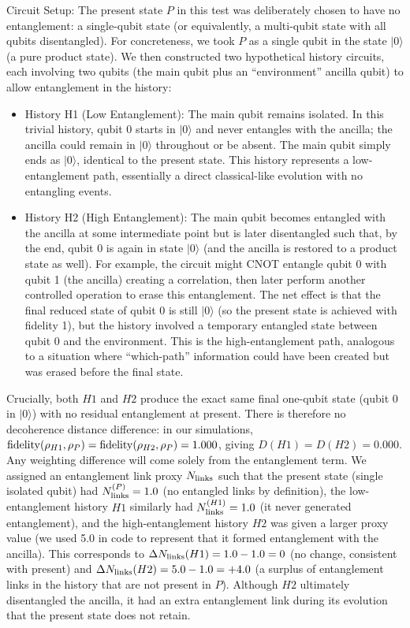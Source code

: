 \documentclass[11pt]{article}
\begin{document}
Circuit Setup: The present state $P$ in this test was deliberately chosen to have no entanglement: a single-qubit state (or equivalently, a multi-qubit state with all qubits disentangled). For concreteness, we took $P$ as a single qubit in the state $|0\rangle$ (a pure product state). We then constructed two hypothetical history circuits, each involving two qubits (the main qubit plus an “environment” ancilla qubit) to allow entanglement in the history:
\begin{itemize}
    \item History H1 (Low Entanglement): The main qubit remains isolated. In this trivial history, qubit 0 starts in $|0\rangle$ and never entangles with the ancilla; the ancilla could remain in $|0\rangle$ throughout or be absent. The main qubit simply ends as $|0\rangle$, identical to the present state. This history represents a low-entanglement path, essentially a direct classical-like evolution with no entangling events.
    \item History H2 (High Entanglement): The main qubit becomes entangled with the ancilla at some intermediate point but is later disentangled such that, by the end, qubit 0 is again in state $|0\rangle$ (and the ancilla is restored to a product state as well). For example, the circuit might CNOT entangle qubit 0 with qubit 1 (the ancilla) creating a correlation, then later perform another controlled operation to erase this entanglement. The net effect is that the final reduced state of qubit 0 is still $|0\rangle$ (so the present state is achieved with fidelity 1), but the history involved a temporary entangled state between qubit 0 and the environment. This is the high-entanglement path, analogous to a situation where “which-path” information could have been created but was erased before the final state.
\end{itemize}
Crucially, both $H1$ and $H2$ produce the exact same final one-qubit state (qubit 0 in $|0\rangle$) with no residual entanglement at present. There is therefore no decoherence distance difference: in our simulations, ${\rm fidelity}(\rho_{H1}, \rho_P) = {\rm fidelity}(\rho_{H2}, \rho_P) = 1.000$, giving $D(H1)=D(H2)=0.000$​. Any weighting difference will come solely from the entanglement term. We assigned an entanglement link proxy $N_{\rm links}$ such that the present state (single isolated qubit) had $N_{\rm links}^{(P)} = 1.0$ (no entangled links by definition), the low-entanglement history $H1$ similarly had $N_{\rm links}^{(H1)} = 1.0$ (it never generated entanglement), and the high-entanglement history $H2$ was given a larger proxy value (we used 5.0 in code to represent that it formed entanglement with the ancilla). This corresponds to $\Delta N_{\rm links}(H1) = 1.0 - 1.0 = 0$ (no change, consistent with present) and $\Delta N_{\rm links}(H2) = 5.0 - 1.0 = +4.0$ (a surplus of entanglement links in the history that are not present in $P$). Although $H2$ ultimately disentangled the ancilla, it had an extra entanglement link during its evolution that the present state does not retain.
\end{document}
